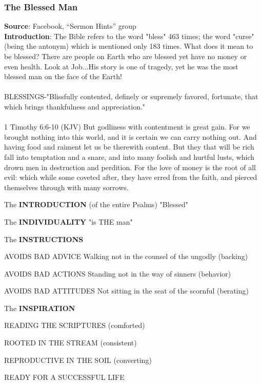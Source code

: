 \subsubsection{The Blessed Man}
\textbf{Source}: Facebook, ``Sermon Hints'' group\\
\textbf{Introduction}: The Bible refers to the word "bless" 463 times; the word "curse" (being the antonym) which is mentioned only 183 times. What does it mean to be blessed? There are people on Earth who are blessed yet have no money or even health. Look at Job...His story is one of tragedy, yet he was the most blessed man on the face of the Earth!\\
\\
BLESSINGS-"Blissfully contented, definely or supremely favored, fortunate, that which brings thankfulness and appreciation."\\
\\
1 Timothy 6:6-10 (KJV) But godliness with contentment is great gain. For we brought nothing into this world, and it is certain we can carry nothing out. And having food and raiment let us be therewith content. But they that will be rich fall into temptation and a snare, and into many foolish and hurtful lusts, which drown men in destruction and perdition. For the love of money is the root of all evil: which while some coveted after, they have erred from the faith, and pierced themselves through with many sorrows.
\begin{compactenum}[I.][7]
	\item The \textbf{INTRODUCTION}   (of the entire Psalms) "Blessed"
	\item The \textbf{INDIVIDUALITY}   "is THE man"
	\item The \textbf{INSTRUCTIONS} 
	\begin{compactenum}[A.]
		\item AVOIDS BAD ADVICE
Walking not in the counsel of the ungodly
(backing)
		\item AVOIDS BAD ACTIONS
Standing not in the way of sinners (behavior)
		\item AVOIDS BAD ATTITUDES
Not sitting in the seat of the scornful (berating)
	\end{compactenum}
\item The \textbf{INSPIRATION} 
	\begin{compactenum}[A.]
		\item READING THE SCRIPTURES (comforted)
		\item ROOTED IN THE STREAM (consistent)
		\item REPRODUCTIVE IN THE SOIL (converting)
		\item READY FOR A SUCCESSFUL LIFE
	\end{compactenum}
\end{compactenum}